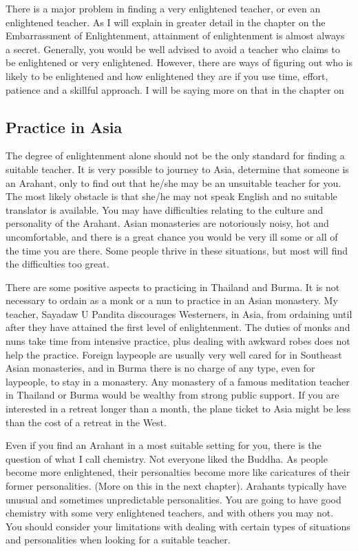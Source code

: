 \documentclass[a5paper,10pt,english]{book}
\begin{document}
\sphinxAtStartPar
There is a major problem in finding a very enlightened teacher, or even
an enlightened teacher. As I will explain in greater detail in the
chapter on the Embarrassment of Enlightenment, attainment of
enlightenment is almost always a secret. Generally, you would be well
advised to avoid a teacher who claims to be enlightened or very
enlightened. However, there are ways of figuring out who is likely to be
enlightened and how enlightened they are if you use time, effort,
patience and a skillful approach. I will be saying more on that in the
chapter on 


\subsection{Practice in Asia}
\label{\detokenize{saints:practice-in-asia}}
\sphinxAtStartPar
The degree of enlightenment alone should not be the only standard for
finding a suitable teacher. It is very possible to journey to Asia,
determine that someone is an Arahant, only to find out that he/she may
be an unsuitable teacher for you. The most likely obstacle is that
she/he may not speak English and no suitable translator is available.
You may have difficulties relating to the culture and personality of the
Arahant. Asian monasteries are notoriously noisy, hot and uncomfortable,
and there is a great chance you would be very ill some or all of the
time you are there. Some people thrive in these situations, but most
will find the difficulties too great.

\sphinxAtStartPar
There are some positive aspects to practicing in Thailand and Burma. It
is not necessary to ordain as a monk or a nun to practice in an Asian
monastery. My teacher, Sayadaw U Pandita discourages Westerners, in
Asia, from ordaining until after they have attained the first level of
enlightenment. The duties of monks and nuns take time from intensive
practice, plus dealing with awkward robes does not help the practice.
Foreign laypeople are usually very well cared for in Southeast Asian
monasteries, and in Burma there is no charge of any type, even for
laypeople, to stay in a monastery. Any monastery of a famous meditation
teacher in Thailand or Burma would be wealthy from strong public
support. If you are interested in a retreat longer than a month, the
plane ticket to Asia might be less than the cost of a retreat in the
West.

\sphinxAtStartPar
Even if you find an Arahant in a most suitable setting for you, there is
the question of what I call chemistry. Not everyone liked the Buddha. As
people become more enlightened, their personalties become more like
caricatures of their former personalities. (More on this in the next
chapter). Arahants typically have unusual and sometimes unpredictable
personalities. You are going to have good chemistry with some very
enlightened teachers, and with others you may not. You should consider
your limitations with dealing with certain types of situations and
personalities when looking for a suitable teacher.
\end{document}
